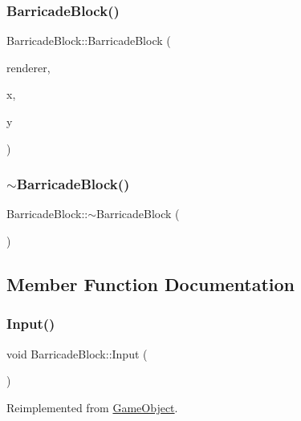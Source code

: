 \subsubsection{\texorpdfstring{Barricade\+Block()}{BarricadeBlock()}}
{\footnotesize\ttfamily Barricade\+Block\+::\+Barricade\+Block (\begin{DoxyParamCaption}\item[{S\+D\+L\+\_\+\+Renderer $\ast$}]{renderer,  }\item[{int}]{x,  }\item[{int}]{y }\end{DoxyParamCaption})}

\mbox{\label{class_barricade_block_ae4a2910fc259d532cb07179b8da76c4e}} 
\subsubsection{\texorpdfstring{$\sim$\+Barricade\+Block()}{~BarricadeBlock()}}
{\footnotesize\ttfamily Barricade\+Block\+::$\sim$\+Barricade\+Block (\begin{DoxyParamCaption}{ }\end{DoxyParamCaption})}



\subsection{Member Function Documentation}
\mbox{\label{class_barricade_block_adc4d1d90b1d7ad2a6b043aef0a9886d2}} 
\subsubsection{\texorpdfstring{Input()}{Input()}}
{\footnotesize\ttfamily void Barricade\+Block\+::\+Input (\begin{DoxyParamCaption}{ }\end{DoxyParamCaption})\hspace{0.3cm}{\ttfamily [virtual]}}



Reimplemented from \mbox{\hyperlink{class_game_object_a430742cf91abb99337c556c88bef880a}{Game\+Object}}.

